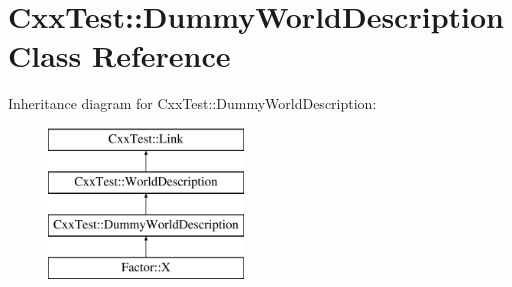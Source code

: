 \hypertarget{classCxxTest_1_1DummyWorldDescription}{\section{Cxx\-Test\-:\-:Dummy\-World\-Description Class Reference}
\label{classCxxTest_1_1DummyWorldDescription}
}
Inheritance diagram for Cxx\-Test\-:\-:Dummy\-World\-Description\-:\begin{figure}[H]
\begin{center}
\leavevmode
\includegraphics[height=4.000000cm]{classCxxTest_1_1DummyWorldDescription}
\end{center}
\end{figure}
